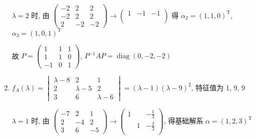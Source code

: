\begin{enumerate}
                   \( \lambda = 2 \) 时, 由 \( \begin{pmatrix}
                       -2 & 2  & 2  \\
                       -2 & 2  & 2  \\
                       2  & -2 & -2
                   \end{pmatrix} \rightarrow \begin{pmatrix}
                       1 & -1 & -1 \\
                         &    &    \\
                         &    &
                   \end{pmatrix} \) 得 \( \alpha_{2} = (1, 1, 0)^{\mathrm{T}} \), \( \alpha_{3} = (1, 0, 1)^{\mathrm{T}} \)

                   故 \( P = \begin{pmatrix}
                       1  & 1 & 1 \\
                       1  & 1 & 0 \\
                       -1 & 0 & 1
                   \end{pmatrix} \), \( P^{-1}AP = \operatorname{diag}(0, -2, -2) \)
             \item %
                   \(f_{A}(\lambda)=
                   \begin{vmatrix}
                       \lambda-8 & 2         & 1         \\
                       2         & \lambda-5 & 2         \\
                       3         & 6         & \lambda-6
                   \end{vmatrix}
                   = (\lambda-1)(\lambda-9)^{2}\), 特征值为 1, 9, 9

                   \(\lambda = 1\) 时, 由 \(
                   \begin{pmatrix}
                       -7 & 2  & 1  \\
                       2  & -4 & 2  \\
                       3  & 6  & -5
                   \end{pmatrix}\to \begin{pmatrix}
                       1 &   & -\frac{1}{3} \\
                         & 1 & -\frac{2}{3} \\
                         &   &
                   \end{pmatrix} \), 得基础解系 \(\alpha=(1,2,3)^{\mathrm{T}}\)


\end{enumerate}
